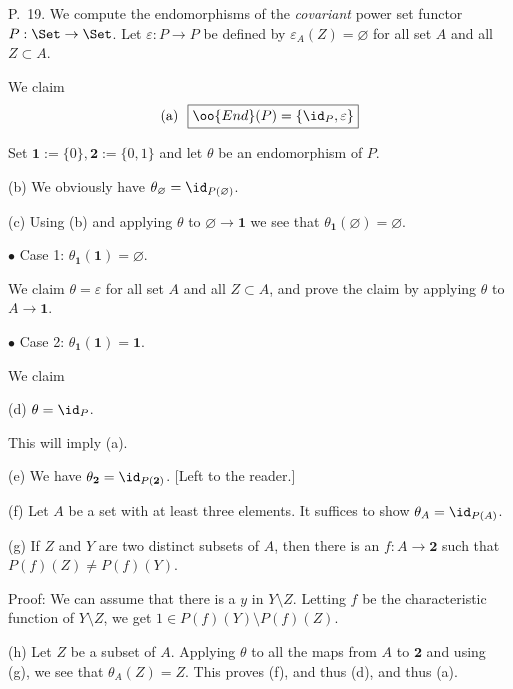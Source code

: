 \documentclass[12pt]{article}
\theoremstyle{remark}
\theoremstyle{definition}
\begin{document}
\begin{s}
P.~19. We compute the endomorphisms of the \emph{covariant} power set functor $P:\Set\to\Set$. Let $\varepsilon:P\to P$ be defined by $\varepsilon_A(Z)=\varnothing$ for all set $A$ and all $Z\subset A$.

\nn We claim 
$$
\text{(a) }\ \boxed{\oo{End}(P)=\{\id_P,\varepsilon\}}
$$ 

\nn Set $\mathbf 1:=\{0\},\mathbf 2:=\{0,1\}$ and let $\theta$ be an endomorphism of $P$.

\nn(b) We obviously have $\theta_\varnothing=\id_{P(\varnothing)}$.

\nn(c) Using (b) and applying $\theta$ to $\varnothing\to\mathbf 1$ we see that $\theta_{\mathbf 1}(\varnothing)=\varnothing$. 

\nn $\bullet$ Case 1: $\theta_{\mathbf 1}(\mathbf 1)=\varnothing$. 

\nn We claim $\theta=\varepsilon$ for all set $A$ and all $Z\subset A$, and prove the claim by applying $\theta$ to $A\to\mathbf 1$.

\nn $\bullet$ Case 2: $\theta_{\mathbf 1}(\mathbf 1)=\mathbf 1$. 

\nn We claim 

\nn(d) $\theta=\id_P$. 

\nn This will imply (a).

\nn(e) We have $\theta_{\mathbf 2}=\id_{P(\mathbf 2)}$. [Left to the reader.]

\nn(f) Let $A$ be a set with at least three elements. It suffices to show $\theta_A=\id_{P(A)}$.

\nn(g) If $Z$ and $Y$ are two distinct subsets of $A$, then there is an $f:A\to\mathbf 2$ such that $P(f)(Z)\ne P(f)(Y)$. 

\nn Proof: We can assume that there is a $y$ in $Y\setminus Z$. Letting $f$ be the characteristic function of $Y\setminus Z$, we get $1\in P(f)(Y)\setminus P(f)(Z)$.

\nn(h) Let $Z$ be a subset of $A$. Applying $\theta$ to all the maps from $A$ to $\mathbf 2$ and using (g), we see that $\theta_A(Z)=Z$. This proves (f), and thus (d), and thus (a).
\end{s}

%
\end{document}
